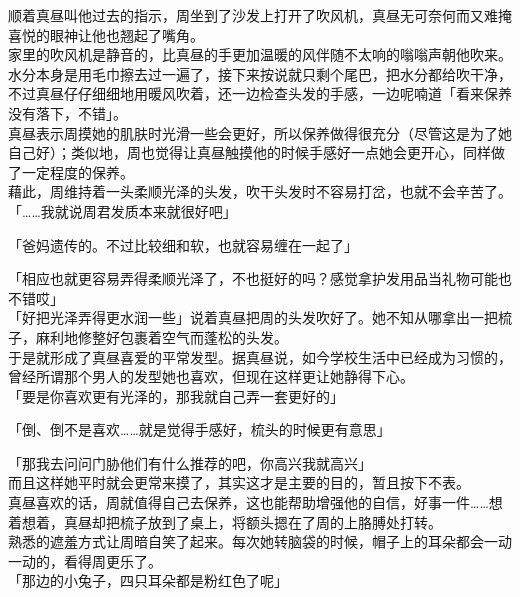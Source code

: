 顺着真昼叫他过去的指示，周坐到了沙发上打开了吹风机，真昼无可奈何而又难掩喜悦的眼神让他也翘起了嘴角。\\

家里的吹风机是静音的，比真昼的手更加温暖的风伴随不太响的嗡嗡声朝他吹来。\\

水分本身是用毛巾擦去过一遍了，接下来按说就只剩个尾巴，把水分都给吹干净，不过真昼仔仔细细地用暖风吹着，还一边检查头发的手感，一边呢喃道「看来保养没有落下，不错」。\\

真昼表示周摸她的肌肤时光滑一些会更好，所以保养做得很充分（尽管这是为了她自己好）；类似地，周也觉得让真昼触摸他的时候手感好一点她会更开心，同样做了一定程度的保养。\\

藉此，周维持着一头柔顺光泽的头发，吹干头发时不容易打岔，也就不会辛苦了。\\

「……我就说周君发质本来就很好吧」

「爸妈遗传的。不过比较细和软，也就容易缠在一起了」

「相应也就更容易弄得柔顺光泽了，不也挺好的吗？感觉拿护发用品当礼物可能也不错哎」\\

「好把光泽弄得更水润一些」说着真昼把周的头发吹好了。她不知从哪拿出一把梳子，麻利地修整好包裹着空气而蓬松的头发。\\

于是就形成了真昼喜爱的平常发型。据真昼说，如今学校生活中已经成为习惯的，曾经所谓那个男人的发型她也喜欢，但现在这样更让她静得下心。\\

「要是你喜欢更有光泽的，那我就自己弄一套更好的」

「倒、倒不是喜欢……就是觉得手感好，梳头的时候更有意思」

「那我去问问门胁他们有什么推荐的吧，你高兴我就高兴」\\

而且这样她平时就会更常来摸了，其实这才是主要的目的，暂且按下不表。\\

真昼喜欢的话，周就值得自己去保养，这也能帮助增强他的自信，好事一件……想着想着，真昼却把梳子放到了桌上，将额头摁在了周的上胳膊处打转。\\

熟悉的遮羞方式让周暗自笑了起来。每次她转脑袋的时候，帽子上的耳朵都会一动一动的，看得周更乐了。\\

「那边的小兔子，四只耳朵都是粉红色了呢」

